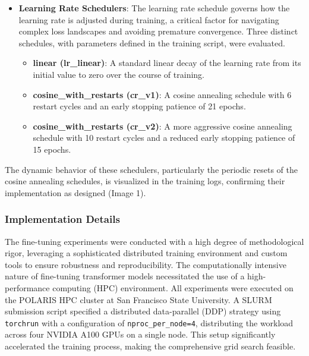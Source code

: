 \begin{itemize}
\begin{itemize}
          \end{itemize}
    \item \textbf{Learning Rate Schedulers}: The learning rate schedule governs how the learning rate is adjusted during training, a critical factor for navigating complex loss landscapes and avoiding premature convergence. Three distinct schedules, with parameters defined in the training script, were evaluated.
          \begin{itemize}
              \item \textbf{linear (lr\_linear)}: A standard linear decay of the learning rate from its initial value to zero over the course of training.
              \item \textbf{cosine\_with\_restarts (cr\_v1)}: A cosine annealing schedule with 6 restart cycles and an early stopping patience of 21 epochs.
              \item \textbf{cosine\_with\_restarts (cr\_v2)}: A more aggressive cosine annealing schedule with 10 restart cycles and a reduced early stopping patience of 15 epochs.
          \end{itemize}
\end{itemize}
The dynamic behavior of these schedulers, particularly the periodic resets of the cosine annealing schedules, is visualized in the training logs, confirming their implementation as designed (Image 1).

\subsubsection{Implementation Details}
The fine-tuning experiments were conducted with a high degree of methodological rigor, leveraging a sophisticated distributed training environment and custom tools to ensure robustness and reproducibility. The computationally intensive nature of fine-tuning transformer models necessitated the use of a high-performance computing (HPC) environment. All experiments were executed on the POLARIS HPC cluster at San Francisco State University. A SLURM submission script specified a distributed data-parallel (DDP) strategy using \verb|torchrun| with a configuration of \verb|nproc_per_node=4|, distributing the workload across four NVIDIA A100 GPUs on a single node. This setup significantly accelerated the training process, making the comprehensive grid search feasible.

